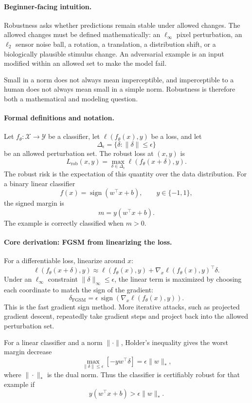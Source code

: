 \paragraph{Beginner-facing intuition.}
Robustness asks whether predictions remain stable under allowed changes. The allowed changes must be defined mathematically: an \(\ell_\infty\) pixel perturbation, an \(\ell_2\) sensor noise ball, a rotation, a translation, a distribution shift, or a biologically plausible stimulus change. An adversarial example is an input modified within an allowed set to make the model fail.

Small in a norm does not always mean imperceptible, and imperceptible to a human does not always mean small in a simple norm. Robustness is therefore both a mathematical and modeling question.

\paragraph{Formal definitions and notation.}
Let \(f_\theta:\mathcal X\to\mathcal Y\) be a classifier, let \(\ell(f_\theta(x),y)\) be a loss, and let
\[
\Delta_\epsilon=\{\delta:\|\delta\|\leq\epsilon\}
\]
be an allowed perturbation set. The robust loss at \((x,y)\) is
\[
\boxed{
L_{\mathrm{rob}}(x,y)
=\max_{\delta\in\Delta_\epsilon}
\ell(f_\theta(x+\delta),y).
}
\]
The robust risk is the expectation of this quantity over the data distribution. For a binary linear classifier
\[
f(x)=\operatorname{sign}(w^\top x+b),\qquad y\in\{-1,1\},
\]
the signed margin is
\[
m=y(w^\top x+b).
\]
The example is correctly classified when \(m>0\).

\paragraph{Core derivation: FGSM from linearizing the loss.}
For a differentiable loss, linearize around \(x\):
\[
\ell(f_\theta(x+\delta),y)
\approx
\ell(f_\theta(x),y)+\nabla_x\ell(f_\theta(x),y)^\top\delta.
\]
Under an \(\ell_\infty\) constraint \(\|\delta\|_\infty\leq\epsilon\), the linear term is maximized by choosing each coordinate to match the sign of the gradient:
\[
\boxed{
\delta_{\mathrm{FGSM}}
=\epsilon\,\operatorname{sign}(\nabla_x\ell(f_\theta(x),y)).
}
\]
This is the fast gradient sign method. More iterative attacks, such as projected gradient descent, repeatedly take gradient steps and project back into the allowed perturbation set.

For a linear classifier and a norm \(\|\cdot\|\), Holder's inequality gives the worst margin decrease
\[
\max_{\|\delta\|\leq\epsilon}[-y w^\top\delta]
=\epsilon\|w\|_*,
\]
where \(\|\cdot\|_*\) is the dual norm. Thus the classifier is certifiably robust for that example if
\[
y(w^\top x+b)>\epsilon\|w\|_*.
\]

